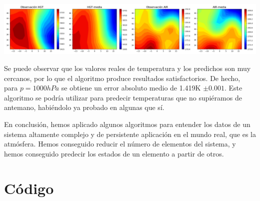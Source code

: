 \documentclass[a4paper]{article}
\begin{document}
	\includegraphics[width=\linewidth]{3}
	
	Se puede observar que los valores reales de temperatura y los predichos son muy cercanos, por lo que el algoritmo produce resultados satisfactorios. De hecho, para $p=1000hPa$ se obtiene un error absoluto medio de 1.419K $\pm0.001$. Este algoritmo se podría utilizar para predecir temperaturas que no supiéramos de antemano, habiéndolo ya probado en algunas que sí.
	
	En conclusión, hemos aplicado algunos algoritmos para entender los datos de un sistema altamente complejo y de persistente aplicación en el mundo real, que es la atmósfera. Hemos conseguido reducir el número de elementos del sistema, y hemos conseguido predecir los estados de un elemento a partir de otros.
	
	\newpage
	\section{Código}\label{codigo}
	
	
	
\end{document}
